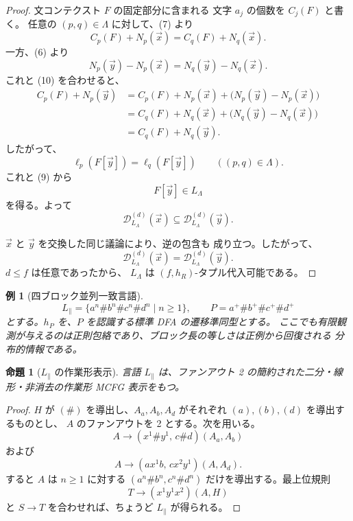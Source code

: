 \documentclass[11pt,a4paper]{ltjsarticle}
\newtheorem{proposition}[theorem]{命題}
\newtheorem{example}[theorem]{例}
\theoremstyle{remark}
\newcommand{\D}{\mathcal{D}}
\newcommand{\tuple}[1]{\vec{#1}}
\begin{document}
\begin{proof}
文コンテクスト \(F\) の固定部分に含まれる
文字 \(a_j\) の個数を \(C_j(F)\) と書く。
任意の \((p,q)\in\Lambda\) に対して、(7) より
\[
  C_p(F)+N_p(\tuple x)
  =
  C_q(F)+N_q(\tuple x).
  \tag{10}
\]
一方、(6) より
\[
  N_p(\tuple y)-N_p(\tuple x)
  =
  N_q(\tuple y)-N_q(\tuple x).
\]
これと (10) を合わせると、
\[
\begin{aligned}
  C_p(F)+N_p(\tuple y)
  &=
  C_p(F)+N_p(\tuple x)
    +\bigl(N_p(\tuple y)-N_p(\tuple x)\bigr)
  \\
  &=
  C_q(F)+N_q(\tuple x)
    +\bigl(N_q(\tuple y)-N_q(\tuple x)\bigr)
  \\
  &=
  C_q(F)+N_q(\tuple y).
\end{aligned}
\]
したがって、
\[
  \ell_p(F[\tuple y])
  =
  \ell_q(F[\tuple y])
  \qquad
  ((p,q)\in\Lambda).
\]
これと (9) から
\[
  F[\tuple y]\in L_\Lambda
\]
を得る。よって
\[
  \D_{L_\Lambda}^{(d)}(\tuple x)
  \subseteq
  \D_{L_\Lambda}^{(d)}(\tuple y).
\]

\(\tuple x\) と \(\tuple y\) を交換した同じ議論により、逆の包含も
成り立つ。したがって、
\[
  \D_{L_\Lambda}^{(d)}(\tuple x)
  =
  \D_{L_\Lambda}^{(d)}(\tuple y).
\]
\(d\le f\) は任意であったから、
\(L_\Lambda\) は \((f,h_R)\)-タプル代入可能である。
\end{proof}



\begin{example}[四ブロック並列一致言語]
\label{ex:parallel-language}
\[
  L_{\parallel}=\{a^n\#b^n\#c^n\#d^n\mid n\ge1\},
  \qquad P=a^+\#b^+\#c^+\#d^+
\]
とする。\(h_P\) を、\(P\) を認識する標準 DFA の遷移準同型とする。
ここでも有限観測が与えるのは正則包絡であり、ブロック長の等しさは正例から回復される
分布的情報である。
\end{example}

\begin{proposition}[\(L_{\parallel}\) の作業形表示]
\label{prop:parallel-running-example}
言語 \(L_{\parallel}\) は、ファンアウト 2 の簡約された二分・線形・非消去の作業形 MCFG 表示をもつ。
\end{proposition}

\begin{proof}
\(H\) が \((\#)\) を導出し、\(A_a,A_b,A_d\) がそれぞれ \((a),(b),(d)\) を導出するものとし、
\(A\) のファンアウトを 2 とする。次を用いる。
\[
  A\to(x^1\#y^1,\,c\#d)(A_a,A_b)
\]
および
\[
  A\to(a x^1 b,\,c x^2 y^1)(A,A_d).
\]
すると \(A\) は \(n\ge1\) に対する
\((a^n\#b^n,c^n\#d^n)\) だけを導出する。最上位規則
\[
  T\to(x^1y^1x^2)(A,H)
\]
と \(S\to T\) を合わせれば、ちょうど \(L_{\parallel}\) が得られる。
\end{proof}
\end{document}
